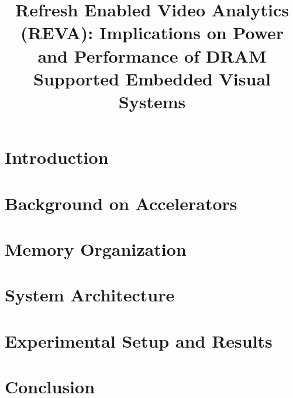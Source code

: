 \documentclass[conference]{IEEEtran}
\begin{document}



\title{Refresh Enabled Video Analytics (REVA): Implications on Power and Performance of DRAM Supported Embedded Visual Systems}



\date{}
\maketitle

\thispagestyle{empty}

\begin{abstract}
\label{sec:abstract}	%

\end{abstract}

\section{Introduction}
\label{sec:introduction}			%


\section{Background on Accelerators}
\label{sec:accelerator-background}			%


\section{Memory Organization}
\label{sec:memory}			%


\section{System Architecture}
\label{sec:architecture}			%



\section{Experimental Setup and Results}
\label{sec:results}			%


\section{Conclusion}
\label{sec:conclusion}			%





\end{document}
